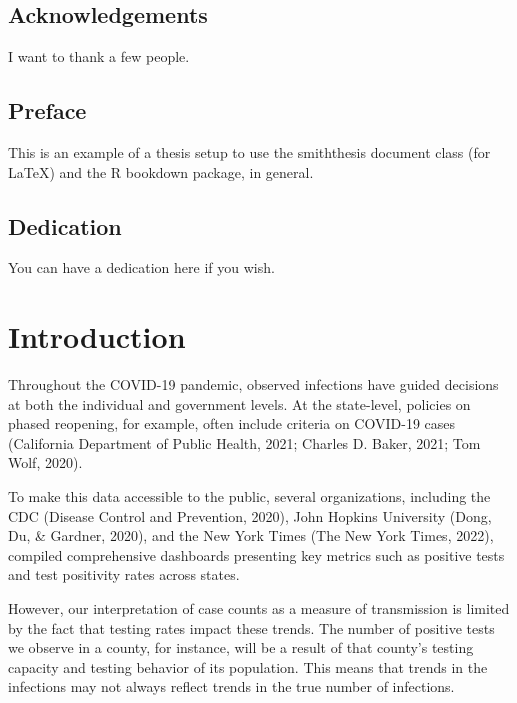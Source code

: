 \documentclass[12pt,twoside]{smiththesis}
\begin{document}
\hypertarget{acknowledgements}{%
\section*{Acknowledgements}\label{acknowledgements}}

I want to thank a few people.

\hypertarget{preface}{%
\section*{Preface}\label{preface}}

This is an example of a thesis setup to use the smiththesis document class
(for LaTeX) and the R bookdown package, in general.

\hypertarget{dedication}{%
\section*{Dedication}\label{dedication}}

You can have a dedication here if you wish.

\hypertarget{introduction}{%
\chapter{Introduction}\label{introduction}}

\vspace{.2 mm}
\textbar{} Throughout the COVID-19 pandemic, observed infections have guided decisions at both the individual and government levels. At the state-level, policies on phased reopening, for example, often include criteria on COVID-19 cases (California Department of Public Health, 2021; Charles D. Baker, 2021; Tom Wolf, 2020).

To make this data accessible to the public, several organizations, including the CDC (Disease Control and Prevention, 2020), John Hopkins University (Dong, Du, \& Gardner, 2020), and the New York Times (The New York Times, 2022), compiled comprehensive dashboards presenting key metrics such as positive tests and test positivity rates across states.

However, our interpretation of case counts as a measure of transmission is limited by the fact that testing rates impact these trends. The number of positive tests we observe in a county, for instance, will be a result of that county's testing capacity and testing behavior of its population. This means that trends in the infections may not always reflect trends in the true number of infections.
\end{document}
